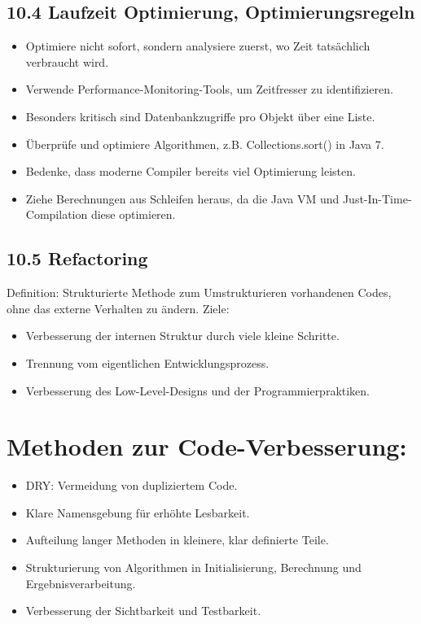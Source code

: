 \documentclass[10pt]{article}
\begin{document}
\subsection*{10.4 Laufzeit Optimierung, Optimierungsregeln}
\begin{itemize}
  \item Optimiere nicht sofort, sondern analysiere zuerst, wo Zeit tatsächlich verbraucht wird.
  \item Verwende Performance-Monitoring-Tools, um Zeitfresser zu identifizieren.
  \item Besonders kritisch sind Datenbankzugriffe pro Objekt über eine Liste.
  \item Überprüfe und optimiere Algorithmen, z.B. Collections.sort() in Java 7.
  \item Bedenke, dass moderne Compiler bereits viel Optimierung leisten.
  \item Ziehe Berechnungen aus Schleifen heraus, da die Java VM und Just-In-Time-Compilation diese optimieren.
\end{itemize}

\subsection*{10.5 Refactoring}
Definition: Strukturierte Methode zum Umstrukturieren vorhandenen Codes, ohne das externe Verhalten zu ändern. Ziele:

\begin{itemize}
  \item Verbesserung der internen Struktur durch viele kleine Schritte.
  \item Trennung vom eigentlichen Entwicklungsprozess.
  \item Verbesserung des Low-Level-Designs und der Programmierpraktiken.
\end{itemize}

\section*{Methoden zur Code-Verbesserung:}
\begin{itemize}
  \item DRY: Vermeidung von dupliziertem Code.
  \item Klare Namensgebung für erhöhte Lesbarkeit.
  \item Aufteilung langer Methoden in kleinere, klar definierte Teile.
  \item Strukturierung von Algorithmen in Initialisierung, Berechnung und Ergebnisverarbeitung.
  \item Verbesserung der Sichtbarkeit und Testbarkeit.
\end{itemize}
\end{document}
